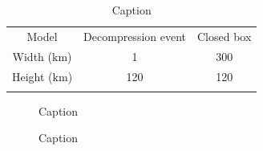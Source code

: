 \begin{table}[]
    \centering
    \begin{tabular}{c|c|c}
        Model & Decompression event & Closed box  \\
        Width ($\mathrm{km}$) & 1 & 300 \\
        Height ($\mathrm{km}$) & 120 & 120 \\
         & 
    \end{tabular}
    \caption{Caption}
    \label{tab:decompression_params}
\end{table}

\begin{figure}
    \centering
    
    \caption{}
    \label{fig:decompression_batch}
\end{figure}

\begin{figure}
    \centering
    
    \caption{Caption}
    \label{fig:decompression_frac}
\end{figure}

\begin{figure}
    \centering
    
    \caption{Caption}
    \label{fig:decompression_2pp}
\end{figure}

